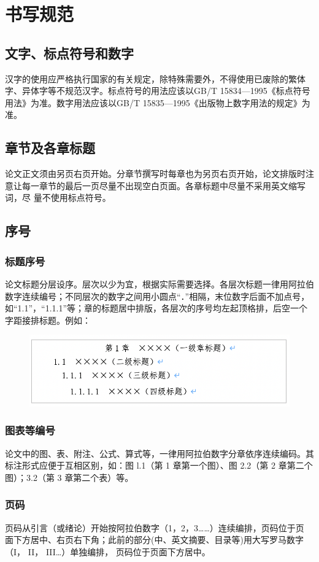 \chapter{书写规范}
\section{文字、标点符号和数字}
汉字的使用应严格执行国家的有关规定，除特殊需要外，不得使用已废除的繁体字、异体字等不规范汉字。标点符号的用法应该以GB/T 15834—1995《标点符号用法》为准。数字用法应该以GB/T 15835—1995《出版物上数字用法的规定》为准。
\section{章节及各章标题}
论文正文须由另页右页开始。分章节撰写时每章也为另页右页开始，论文排版时注 意让每一章节的最后一页尽量不出现空白页面。各章标题中尽量不采用英文缩写词，尽 量不使用标点符号。
\section{序号}
\subsection{标题序号}
论文标题分层设序。层次以少为宜，根据实际需要选择。各层次标题一律用阿拉伯数字连续编号；不同层次的数字之间用小圆点“．”相隔，末位数字后面不加点号，如“1.1”，“1.1.1”等；章的标题居中排版，各层次的序号均左起顶格排，后空一个字距接排标题。例如：
\begin{figure}[!hbp]
    \includegraphics[width=13cm]{./Figures/levels}
    \centering
    \label{fig:levels}
\end{figure}
\subsection{图表等编号}
论文中的图、表、附注、公式、算式等，一律用阿拉伯数字分章依序连续编码。其 标注形式应便于互相区别，如：图 l.1（第 1 章第一个图）、图 2.2（第 2 章第二个图）；3.2（第 3 章第二个表）等。
\subsection{页码}
页码从引言（或绪论）开始按阿拉伯数字（1，2，3……）连续编排，页码位于页 面下方居中、右页右下角；此前的部分(中、英文摘要、目录等)用大写罗马数字（I， II， III…）单独编排， 页码位于页面下方居中。

